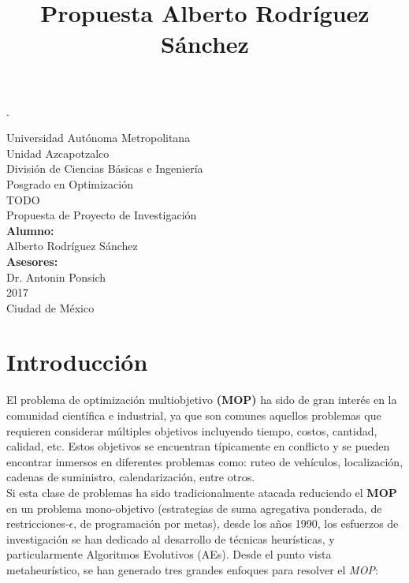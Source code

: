 \documentclass[letterpaper,10pt]{article}
\title{Propuesta Alberto Rodríguez Sánchez}
\begin{document}
\renewcommand{\refname}{Bibliografía}.
\thispagestyle{empty}

\begin{center}
    {\Huge Universidad Autónoma Metropolitana }\\
    {\huge Unidad Azcapotzalco}\\
    \vspace{0.5cm}
    {\Large División de Ciencias Básicas e Ingeniería}\\
    \vspace{1.0cm}
    {\large Posgrado en Optimización}\\
    \vspace{2.0cm}    
    {\Large TODO}\\
    \vspace{1.0cm}
    {\large Propuesta de Proyecto de Investigación}\\
    \vspace{2.0cm}
    {\large\textbf{Alumno:}}\\
    Alberto Rodríguez Sánchez\\
    \vspace{1.5cm}
    \bigskip
    {\large\textbf{Asesores:}}\\
    Dr. Antonin Ponsich\\
    
    \vspace{1.5cm}
     2017\\
    \vspace{1.0cm}
    Ciudad de México\\
\end{center}
\newpage
\tableofcontents
\newpage
\section{Introducción}

El problema de optimización multiobjetivo \textbf{(MOP)} ha sido de gran interés en la comunidad científica e industrial, ya que son comunes aquellos problemas que requieren
considerar múltiples objetivos incluyendo tiempo, costos, cantidad, calidad, etc. Estos objetivos se encuentran típicamente en conflicto y se pueden encontrar inmersos en
diferentes problemas como: ruteo de vehículos, localización, cadenas de suministro, calendarización, entre otros.\\

Si esta clase de problemas ha sido tradicionalmente atacada reduciendo el \textbf{MOP} en un problema mono-objetivo (estrategias de suma agregativa ponderada, de restricciones-$\epsilon$,
de programación por metas), desde los años 1990, los esfuerzos de investigación se han dedicado al desarrollo de técnicas heurísticas, y particularmente Algoritmos Evolutivos (AEs).
Desde el punto vista metaheurístico, se han generado tres grandes enfoques para resolver el \emph{MOP}:
\end{document}
